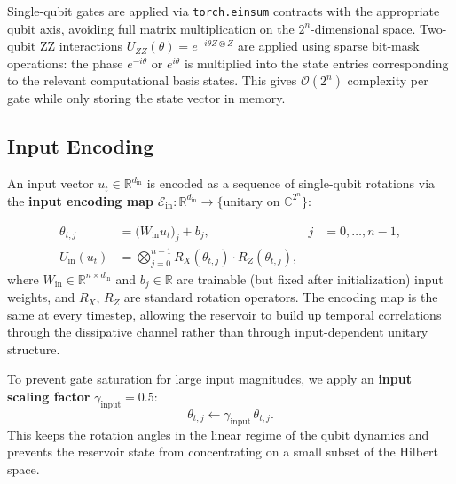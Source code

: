 
Single-qubit gates are applied via \verb|torch.einsum| contracts with
the appropriate qubit axis, avoiding full matrix multiplication on the
$2^n$-dimensional space. Two-qubit ZZ interactions
$U_{ZZ}(\theta) = e^{-i\theta Z\otimes Z}$ are applied using sparse
bit-mask operations: the phase $e^{-i\theta}$ or $e^{i\theta}$ is
multiplied into the state entries corresponding to the relevant
computational basis states. This gives $\mathcal{O}(2^n)$ complexity per
gate while only storing the state vector in memory.


\subsection{Input Encoding}

An input vector $u_t \in \mathbb{R}^{d_{\mathrm{in}}}$ is encoded as a
sequence of single-qubit rotations via the \textbf{input encoding map}
$\mathcal{E}_{\mathrm{in}}: \mathbb{R}^{d_{\mathrm{in}}} \to
\{\text{unitary on } \mathbb{C}^{2^n}\}$:

\begin{subequations}
\label{eq:input_encoding}
\begin{align}
\theta_{t,j} &= \bigl( W_{\mathrm{in}} u_t \bigr)_j + b_j,
& j &= 0, \ldots, n-1, \\[4pt]
U_{\mathrm{in}}(u_t) &= \bigotimes_{j=0}^{n-1}
  R_X(\theta_{t,j}) \cdot R_Z(\theta_{t,j}),
\end{align}
\end{subequations}
where $W_{\mathrm{in}} \in \mathbb{R}^{n \times d_{\mathrm{in}}}$ and
$b_j \in \mathbb{R}$ are trainable (but fixed after initialization)
input weights, and $R_X$, $R_Z$ are standard rotation operators.
The encoding map is the same at every timestep, allowing the reservoir
to build up temporal correlations through the dissipative channel rather
than through input-dependent unitary structure.


To prevent gate saturation for large input magnitudes, we apply an
\textbf{input scaling factor} $\gamma_{\mathrm{input}} = 0.5$:
\begin{equation}
\theta_{t,j} \leftarrow \gamma_{\mathrm{input}} \, \theta_{t,j}.
\end{equation}
This keeps the rotation angles in the linear regime of the qubit
dynamics and prevents the reservoir state from concentrating on a small
subset of the Hilbert space.

